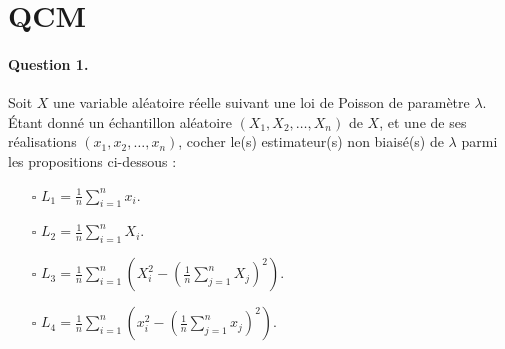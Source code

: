 \section{QCM}

\paragraph{Question 1.} Soit $X$ une variable aléatoire réelle suivant une loi
de Poisson de paramètre $\lambda$. Étant donné un échantillon aléatoire
$(X_1, X_2, \dots, X_n)$ de $X$, et une de ses réalisations
$(x_1, x_2, \dots, x_n)$, cocher le(s) estimateur(s) non biaisé(s) de $\lambda$
parmi les propositions ci-dessous :
\begin{itemize}
\item[$\square$] $L_1 = \frac1n \sum_{i=1}^n x_i.$
\item[$\square$] $L_2 = \frac1n \sum_{i=1}^n X_i.$
\item[$\square$] $L_3 = \frac1n \sum_{i=1}^n \left( X_i^2 - \left( \frac1n \sum_{j=1}^n X_j \right)^2 \right).$
\item[$\square$] $L_4 = \frac1n \sum_{i=1}^n \left( x_i^2 - \left( \frac1n \sum_{j=1}^n x_j \right)^2 \right).$
\end{itemize}


